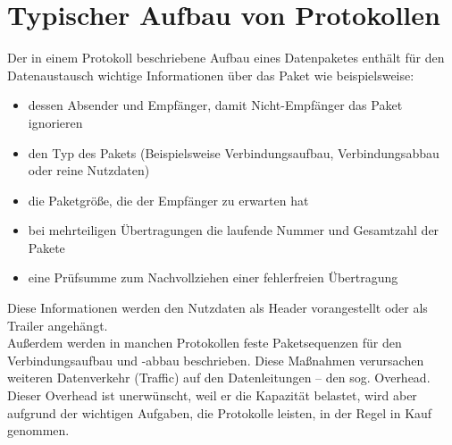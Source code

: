 \section{Typischer Aufbau von Protokollen}
Der in einem Protokoll beschriebene Aufbau eines Datenpaketes enthält für den Datenaustausch wichtige Informationen über das Paket wie beispielsweise:
\begin{itemize}
\item dessen Absender und Empfänger, damit Nicht-Empfänger das Paket ignorieren
\item den Typ des Pakets (Beispielsweise Verbindungsaufbau, Verbindungsabbau oder reine Nutzdaten)
\item die Paketgröße, die der Empfänger zu erwarten hat
\item bei mehrteiligen Übertragungen die laufende Nummer und Gesamtzahl der Pakete
\item eine Prüfsumme zum Nachvollziehen einer fehlerfreien Übertragung
\end{itemize}
Diese Informationen werden den Nutzdaten als Header vorangestellt oder als Trailer angehängt.\\
Außerdem werden in manchen Protokollen feste Paketsequenzen für den Verbindungsaufbau und -abbau beschrieben. Diese Maßnahmen verursachen weiteren Datenverkehr (Traffic) auf den Datenleitungen – den sog. Overhead. Dieser Overhead ist unerwünscht, weil er die Kapazität belastet, wird aber aufgrund der wichtigen Aufgaben, die Protokolle leisten, in der Regel in Kauf genommen.\\